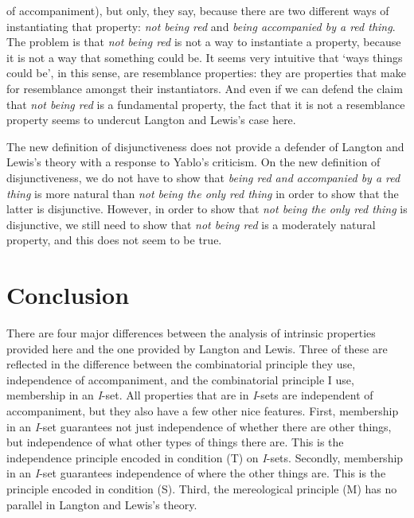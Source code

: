 \documentclass[
  10pt,
  letterpaper,
  DIV=11,
  numbers=noendperiod,
  twoside]{scrartcl}
\begin{document}
of accompaniment), but only, they say, because there are two different
ways of instantiating that property: \emph{not being red} and
\emph{being accompanied by a red thing}. The problem is that \emph{not
being red} is not a way to instantiate a property, because it is not a
way that something could be. It seems very intuitive that `ways things
could be', in this sense, are resemblance properties: they are
properties that make for resemblance amongst their instantiators. And
even if we can defend the claim that \emph{not being red} is a
fundamental property, the fact that it is not a resemblance property
seems to undercut Langton and Lewis's case here.

The new definition of disjunctiveness does not provide a defender of
Langton and Lewis's theory with a response to Yablo's criticism. On the
new definition of disjunctiveness, we do not have to show that
\emph{being red and accompanied by a red thing} is more natural than
\emph{not being the only red thing} in order to show that the latter is
disjunctive. However, in order to show that \emph{not being the only red
thing} is disjunctive, we still need to show that \emph{not being red}
is a moderately natural property, and this does not seem to be true.

\section{Conclusion}\label{conclusion}

There are four major differences between the analysis of intrinsic
properties provided here and the one provided by Langton and Lewis.
Three of these are reflected in the difference between the combinatorial
principle they use, independence of accompaniment, and the combinatorial
principle I use, membership in an \emph{I}-set. All properties that are
in \emph{I}-sets are independent of accompaniment, but they also have a
few other nice features. First, membership in an \emph{I}-set guarantees
not just independence of whether there are other things, but
independence of what other types of things there are. This is the
independence principle encoded in condition (T) on \emph{I}-sets.
Secondly, membership in an \emph{I}-set guarantees independence of where
the other things are. This is the principle encoded in condition (S).
Third, the mereological principle (M) has no parallel in Langton and
Lewis's theory.
\end{document}

